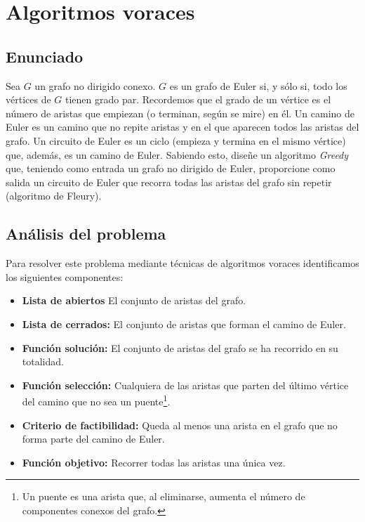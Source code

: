 \chapter{Algoritmos voraces}\label{voraces}

\section{Enunciado}\label{voraces-enunciado}

Sea $G$ un grafo no dirigido conexo.
$G$ es un grafo de Euler si, y sólo si, todo los vértices de $G$ tienen grado par.
Recordemos que el grado de un vértice es el número de aristas que empiezan (o terminan, según se mire) en él.
Un camino de Euler es un camino que no repite aristas y en el que aparecen todos las aristas del grafo.
Un circuito de Euler es un ciclo (empieza y termina en el mismo vértice) que, además, es un camino de Euler.
Sabiendo esto, diseñe un algoritmo \textit{Greedy} que, teniendo como entrada un grafo no
dirigido de Euler, proporcione como salida un circuito de Euler que recorra todas las aristas del grafo sin repetir (algoritmo de Fleury).

\section{Análisis del problema}\label{voraces-analisis}

Para resolver este problema mediante técnicas de algoritmos voraces identificamos los siguientes componentes:

\begin{itemize}
	\item\textbf{Lista de abiertos} El conjunto de aristas del grafo.
	\item\textbf{Lista de cerrados:} El conjunto de aristas que forman el camino de Euler.
	\item\textbf{Función solución:} El conjunto de aristas del grafo se ha recorrido en su totalidad.
	\item\textbf{Función selección:} Cualquiera de las aristas que parten del último vértice del camino que no sea un puente\footnote{%
		Un puente es una arista que, al eliminarse, aumenta el número de componentes conexos del grafo.
	}.
	\item\textbf{Criterio de factibilidad:} Queda al menos una arista en el grafo que no forma parte del camino de Euler.
	\item\textbf{Función objetivo:} Recorrer todas las aristas una única vez.
\end{itemize}

